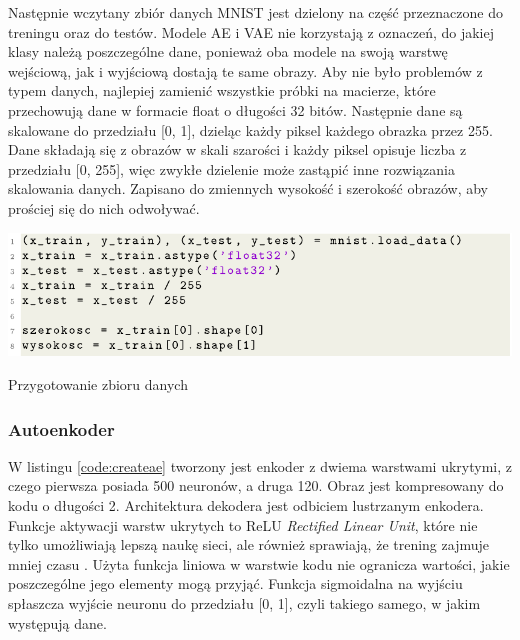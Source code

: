 \documentclass[a4paper,12pt,oneside]{book} %
\begin{document}
Następnie wczytany zbiór danych MNIST jest dzielony na część przeznaczone do treningu oraz do testów. Modele AE i VAE nie korzystają z oznaczeń, do jakiej klasy należą poszczególne dane, ponieważ oba modele na swoją warstwę wejściową, jak i wyjściową dostają te same obrazy. Aby nie było problemów z typem danych, najlepiej zamienić wszystkie próbki na macierze, które przechowują dane w formacie float o długości 32 bitów. Następnie dane są skalowane do przedziału [0, 1], dzieląc każdy piksel każdego obrazka przez 255. Dane składają się z obrazów w skali szarości i każdy piksel opisuje liczba z przedziału [0, 255], więc zwykłe dzielenie może zastąpić inne rozwiązania skalowania danych. Zapisano do zmiennych wysokość i szerokość obrazów, aby prościej się do nich odwoływać.
\begin{code}[h!]
	\centering
	\includegraphics[width=\linewidth]{dane.pdf}
	\caption{Przygotowanie zbioru danych}
	\label{code:dataset}
\end{code}
\subsubsection{Autoenkoder}
 W listingu \ref{code:createae} tworzony jest enkoder z dwiema warstwami ukrytymi, z czego pierwsza posiada 500 neuronów, a druga 120. Obraz jest kompresowany do kodu o długości 2. Architektura dekodera jest odbiciem lustrzanym enkodera. Funkcje aktywacji warstw ukrytych to ReLU \textit{Rectified Linear Unit}, które nie tylko umożliwiają lepszą naukę sieci, ale również sprawiają, że trening zajmuje mniej czasu \cite{relu}. Użyta funkcja liniowa w warstwie kodu nie ogranicza wartości, jakie poszczególne jego elementy mogą przyjąć. Funkcja sigmoidalna na wyjściu spłaszcza wyjście neuronu do przedziału [0, 1], czyli takiego samego, w jakim występują dane.\\
\end{document}
